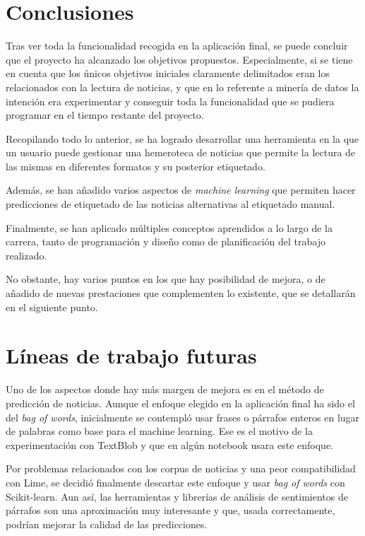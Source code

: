 
\section{Conclusiones}

Tras ver toda la funcionalidad recogida en la aplicación final, se puede concluir que el proyecto ha alcanzado los objetivos propuestos. Especialmente, si se tiene en cuenta que los únicos objetivos iniciales claramente delimitados eran los relacionados con la lectura de noticias, y que en lo referente a minería de datos la intención era experimentar y conseguir toda la funcionalidad que se pudiera programar en el tiempo restante del proyecto.

Recopilando todo lo anterior, se ha logrado desarrollar una herramienta en la que un usuario puede gestionar una hemeroteca de noticias que permite la lectura de las mismas en diferentes formatos y su posterior etiquetado.

Además, se han añadido varios aspectos de \emph{machine learning} que permiten hacer predicciones de etiquetado de las noticias alternativas al etiquetado manual.

Finalmente, se han aplicado múltiples conceptos aprendidos a lo largo de la carrera, tanto de programación y diseño como de planificación del trabajo realizado.

No obstante, hay varios puntos en los que hay posibilidad de mejora, o de añadido de nuevas prestaciones que complementen lo existente, que se detallarán en el siguiente punto.

\section{Líneas de trabajo futuras}

Uno de los aspectos donde hay más margen de mejora es en el método de predicción de noticias. Aunque el enfoque elegido en la aplicación final ha sido el del \emph{bag of words}, inicialmente se contempló usar frases o párrafos enteros en lugar de palabras como base para el machine learning. Ese es el motivo de la experimentación con TextBlob y que en algún notebook usara este enfoque. 

Por problemas relacionados con los corpus de noticias y una peor compatibilidad con Lime, se decidió finalmente descartar este enfoque y usar \emph{bag of words} con Scikit-learn. Aun así, las herramientas y librerías de análisis de sentimientos de párrafos son una aproximación muy interesante y que, usada correctamente, podrían mejorar la calidad de las predicciones.

